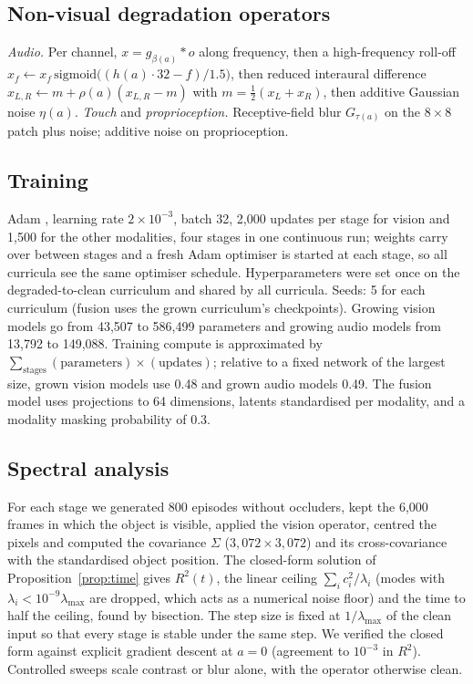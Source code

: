 \documentclass{article}
\theoremstyle{plain}
\theoremstyle{remark}
\begin{document}
\subsection{Non-visual degradation operators}
\label{app:frontends}

\emph{Audio.} Per channel, \(x=g_{\beta(a)}*o\) along frequency, then a high-frequency roll-off \(x_f\leftarrow x_f\,\mathrm{sigmoid}\big((h(a)\cdot32-f)/1.5\big)\), then reduced interaural difference \(x_{L,R}\leftarrow m+\rho(a)(x_{L,R}-m)\) with \(m=\tfrac12(x_L+x_R)\), then additive Gaussian noise \(\eta(a)\). \emph{Touch} and \emph{proprioception.} Receptive-field blur \(G_{\tau(a)}\) on the \(8\times8\) patch plus noise; additive noise on proprioception.

\subsection{Training}

Adam \autocite{kingma2015adam}, learning rate \(2\times10^{-3}\), batch 32, 2,000 updates per stage for vision and 1,500 for the other modalities, four stages in one continuous run; weights carry over between stages and a fresh Adam optimiser is started at each stage, so all curricula see the same optimiser schedule. Hyperparameters were set once on the degraded-to-clean curriculum and shared by all curricula. Seeds: 5 for each curriculum (fusion uses the grown curriculum's checkpoints). Growing vision models go from 43,507 to 586,499 parameters and growing audio models from 13,792 to 149,088. Training compute is approximated by \(\sum_{\text{stages}}(\text{parameters})\times(\text{updates})\); relative to a fixed network of the largest size, grown vision models use 0.48 and grown audio models 0.49. The fusion model uses projections to 64 dimensions, latents standardised per modality, and a modality masking probability of 0.3.

\subsection{Spectral analysis}

For each stage we generated 800 episodes without occluders, kept the 6,000 frames in which the object is visible, applied the vision operator, centred the pixels and computed the covariance \(\Sigma\) (\(3{,}072\times3{,}072\)) and its cross-covariance with the standardised object position. The closed-form solution of Proposition~\ref{prop:time} gives \(R^2(t)\), the linear ceiling \(\sum_i c_i^2/\lambda_i\) (modes with \(\lambda_i<10^{-9}\lambda_{\max}\) are dropped, which acts as a numerical noise floor) and the time to half the ceiling, found by bisection. The step size is fixed at \(1/\lambda_{\max}\) of the clean input so that every stage is stable under the same step. We verified the closed form against explicit gradient descent at \(a=0\) (agreement to \(10^{-3}\) in \(R^2\)). Controlled sweeps scale contrast or blur alone, with the operator otherwise clean.
\end{document}
